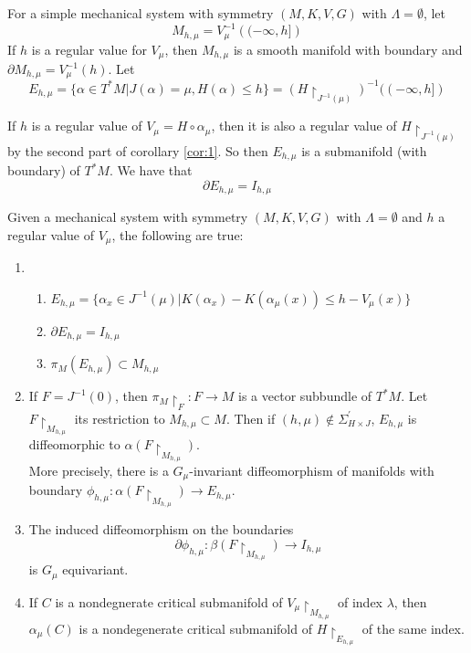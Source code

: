 \indent For a simple mechanical system with symmetry $(M,K,V,G)$ with $\Lambda = \emptyset$, let
\begin{equation}
    M_{h,\mu} = V^{-1}_{\mu} \left( (-\infty, h] \right)
\end{equation}
\indent If $h$ is a regular value for $V_{\mu}$, then $M_{h,\mu}$ is a smooth manifold with boundary and $\partial M_{h,\mu} = V^{-1}_{\mu}(h)$. Let
\begin{equation}
    E_{h,\mu}= \{ \alpha \in T^*M \vert J(\alpha)=\mu, H(\alpha) \leq h \} = (H \restriction_{J^{-1}(\mu)})^{-1}((-\infty, h])
\end{equation}

If $h$ is a regular value of $V_{\mu}=H \circ \alpha_{\mu}$, then it is also a regular value of $H \restriction_{J^{-1}(\mu)}$ by the second part of corollary \ref{cor:1}. So then $E_{h,\mu}$ is a submanifold (with boundary) of $T^*M$. We have that
\begin{equation}
    \partial E_{h,\mu} = I_{h,\mu}
\end{equation}

\begin{thm}
Given a mechanical system with symmetry $(M,K,V,G)$ with $\Lambda = \emptyset$ and $h$ a regular value of $V_{\mu}$, the following are true:
\begin{enumerate}
    \item \begin{enumerate}
        \item $E_{h,\mu}= \{ \alpha_x \in J^{-1}(\mu) \vert K(\alpha_x)-K(\alpha_{\mu}(x)) \leq h - V_{\mu}(x) \}$
        \item $\partial E_{h,\mu} = I_{h,\mu}$
        \item $\pi_M(E_{h,\mu}) \subset M_{h,\mu}$
    \end{enumerate}
    \item If $F=J^{-1}(0)$, then $\pi_M \restriction_{F}: F \to M$ is a vector subbundle of $T^*M$. Let $F\restriction_{M_{h,\mu}}$ its restriction to $M_{h,\mu} \subset M$. Then if $(h,\mu) \notin \Sigma^{\prime}_{H \times J}$, $E_{h,\mu}$ is diffeomorphic to $\alpha(F \restriction_{M_{h,\mu}})$.\\
    \indent More precisely, there is a $G_{\mu}$-invariant diffeomorphism of manifolds with boundary $\phi_{h,\mu}:\alpha(F \restriction_{M_{h,\mu}}) \to E_{h,\mu}$.
    \item The induced diffeomorphism on the boundaries
    \begin{equation}
        \partial \phi_{h,\mu} : \beta(F \restriction_{M_{h,\mu}}) \to I_{h,\mu}
    \end{equation}
    is $G_{\mu}$ equivariant.
    \item If $C$ is a nondegnerate critical submanifold of $V_{\mu} \restriction_{M_{h,\mu}}$ of index $\lambda$, then $\alpha_{\mu}(C)$ is a nondegenerate critical submanifold of $H \restriction_{E_{h,\mu}}$ of the same index.
\end{enumerate}
\end{thm}

